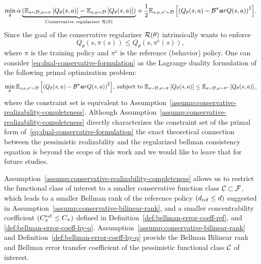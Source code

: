 \begin{align}
    \label{eq:dual-conservative-formulation}
    \min_\theta  {\alpha \underbrace{\left(\mathbb{E}_{s \sim \mathcal{D}, a \sim \pi} \left[Q_\theta(s,a)\right] - \mathbb{E}_{s, a \sim \mathcal{D}}\left[Q_\theta(s,a)\right]\right)}_{\text{Conservative regularizer }\mathcal{R}(\theta)}} + \frac{1}{2} {\mathbb{E}_{s, a, s^\prime\sim \mathcal{D}}\left[\left(Q_\theta(s, a) - \mathcal{B}^\pi\boldsymbol{a}r{Q}(s, a)\right)^2 \right]}.
\end{align}
Since the goal of the conservative regularizer $\mathcal R(\theta)$ intrinsically wants to enforce
\begin{equation}
    Q_\theta(s,\pi(s)) \leq Q_\theta(s,\pi^e(s)),
\end{equation}
where $\pi$ is the training policy and $\pi^e$ is the reference (behavior) policy. One can consider \eqref{eq:dual-conservative-formulation} as the Lagrange duality formulation of the following primal optimization problem:{\small
\begin{equation}
    \min_\theta    {\mathbb{E}_{s, a, s^\prime\sim \mathcal{D}}\left[\left(Q_\theta(s, a) - \mathcal{B}^\pi\boldsymbol{a}r{Q}(s, a)\right)^2 \right]},\;\text{subject to}\; \mathbb{E}_{s \sim \mathcal{D}, a \sim \pi} \left[Q_\theta(s,a)\right] \leq \mathbb{E}_{s\sim \mathcal{D},a\sim\pi^e}\left[Q_\theta(s,a)\right],
\end{equation}
}
where the constraint set is equivalent to Assumption~\ref{assump:conservative-realizability-completeness}. Although Assumption~\ref{assump:conservative-realizability-completeness} directly characterizes the constraint set of the primal form of~\eqref{eq:dual-conservative-formulation} the exact theoretical connection between the pessimistic realizability and the regularized bellman consistency equation is beyond the scope of this work and we would like to leave that for future studies.

Assumption~\ref{assump:conservative-realizability-completeness} allows us to restrict the functional class of interest to a smaller conservative function class $\mathcal C\subset\mathcal F$, which leads to a smaller Bellman rank of the reference policy $(d_\mathrm{ref}\leq d)$ suggested in Assumption~\ref{assump:conservative-bilinear-rank}, and a smaller concentrability coefficient $(C^\mathrm{ref}_\pi\leq C_\pi)$ defined in Definition~\ref{def:bellman-error-coeff-ref}, and \ref{def:bellman-error-coeff-hy-q}. Assumption~\ref{assump:conservative-bilinear-rank} and Definition~\ref{def:bellman-error-coeff-hy-q} provide the Bellman Bilinear rank and Bellman error transfer coefficient of the pessimistic functional class $\mathcal C$ of interest.

